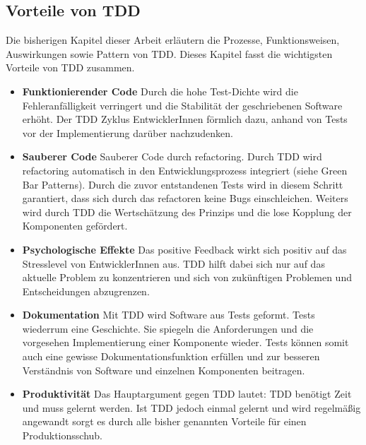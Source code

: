 \subsection{Vorteile von TDD}
\label{Vorteile von TDD}
Die bisherigen Kapitel dieser Arbeit erläutern die Prozesse, Funktionsweisen, Auswirkungen sowie Pattern von TDD. Dieses Kapitel fasst die wichtigsten Vorteile von TDD zusammen.
\begin{itemize}
  \item \textbf{Funktionierender Code}\newline
  Durch die hohe Test-Dichte wird die Fehleranfälligkeit verringert und die Stabilität der geschriebenen Software erhöht. Der TDD Zyklus  EntwicklerInnen förmlich dazu, anhand von Tests vor der Implementierung darüber nachzudenken.
  \item \textbf{Sauberer Code}\newline
  Sauberer Code durch refactoring. Durch TDD wird refactoring automatisch in den Entwicklungsprozess integriert (siehe Green Bar Patterns). Durch die zuvor entstandenen Tests wird in diesem Schritt garantiert, dass sich durch das refactoren keine Bugs einschleichen. Weiters wird durch TDD die Wertschätzung des  Prinzips und die lose Kopplung der Komponenten gefördert\autocite[30]{Johansen:2011}.
  \item \textbf{Psychologische Effekte}\newline
  Das positive Feedback wirkt sich positiv auf das Stresslevel von EntwicklerInnen aus.
  TDD hilft dabei sich nur auf das aktuelle Problem zu konzentrieren und sich von zukünftigen Problemen und Entscheidungen abzugrenzen.
  \item \textbf{Dokumentation}\newline
  Mit TDD wird Software aus Tests geformt. Tests wiederrum  eine Geschichte. Sie spiegeln die Anforderungen und die vorgesehen Implementierung einer Komponente wieder. Tests können somit auch eine gewisse Dokumentationsfunktion erfüllen und zur besseren Verständnis von Software und einzelnen Komponenten beitragen.
  \item \textbf{Produktivität}\newline
  Das Hauptargument gegen TDD lautet: TDD benötigt Zeit und muss gelernt werden.
  Ist TDD jedoch einmal gelernt und wird regelmäßig angewandt sorgt es durch alle bisher genannten Vorteile für einen Produktionsschub.
\end{itemize}


